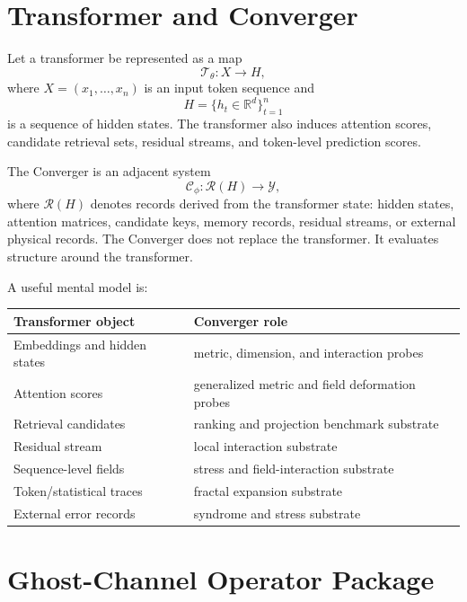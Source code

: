 \documentclass[11pt]{article}
\newcommand{\R}{\mathbb{R}}
\newcommand{\Converger}{\mathcal{C}}
\newcommand{\Transformer}{\mathcal{T}}
\begin{document}
\section{Transformer and Converger}

Let a transformer be represented as a map
\begin{equation}
  \Transformer_\theta : X \longrightarrow H,
\end{equation}
where \(X = (x_1,\dots,x_n)\) is an input token sequence and
\[
  H = \{h_t \in \R^d\}_{t=1}^{n}
\]
is a sequence of hidden states. The transformer also induces attention scores,
candidate retrieval sets, residual streams, and token-level prediction scores.

The Converger is an adjacent system
\begin{equation}
  \Converger_\phi : \mathcal{R}(H) \longrightarrow \mathcal{Y},
\end{equation}
where \(\mathcal{R}(H)\) denotes records derived from the transformer state:
hidden states, attention matrices, candidate keys, memory records, residual
streams, or external physical records. The Converger does not replace the
transformer. It evaluates structure around the transformer.

A useful mental model is:
\begin{center}
\begin{tabular}{ll}
\toprule
\textbf{Transformer object} & \textbf{Converger role} \\
\midrule
Embeddings and hidden states & metric, dimension, and interaction probes \\
Attention scores & generalized metric and field deformation probes \\
Retrieval candidates & ranking and projection benchmark substrate \\
Residual stream & local interaction substrate \\
Sequence-level fields & stress and field-interaction substrate \\
Token/statistical traces & fractal expansion substrate \\
External error records & syndrome and stress substrate \\
\bottomrule
\end{tabular}
\end{center}

\section{Ghost-Channel Operator Package}
\end{document}

